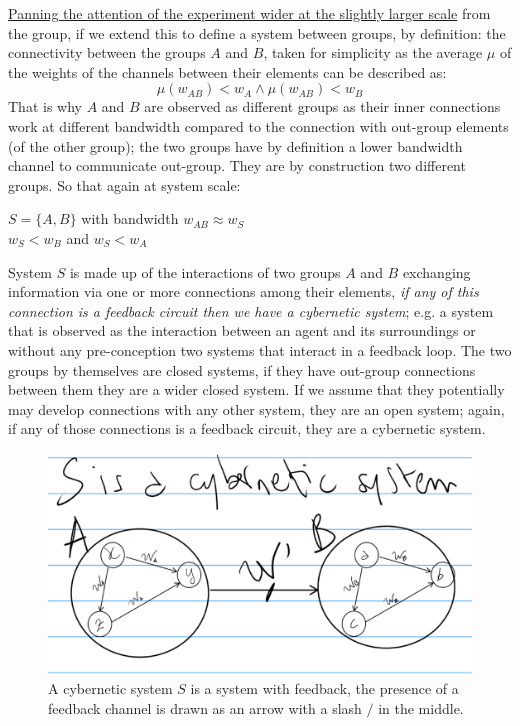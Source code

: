 \documentclass[14pt]{extarticle}
\begin{document}
\hspace*{15mm}\underline{Panning the attention of the experiment wider at the slightly larger scale} from the group, if we extend this to define a system between groups, by definition: the connectivity between the groups \(A\) and \(B\), taken for simplicity as the average $\mu$ of the weights of the channels between their elements can be described as:
\[\mu(w_{AB}) < w_A \wedge \mu(w_{AB}) < w_B\]
That is why \(A\) and \(B\) are observed as different groups as their inner connections work at different bandwidth compared to the connection with out-group elements (of the other group); the two groups have by definition a lower bandwidth channel to communicate out-group. They are by construction two different groups. So that again at system scale:
\begin{center}
\(S = \{ A, B \}\) with bandwidth \(w_{AB} \approx w_S\)\\
\(w_S < w_B\)  and  \(w_S < w_A\)
\end{center}

\hspace*{15mm}System \(S\) is made up of the interactions of two groups \(A\) and \(B\) exchanging information via one or more connections among their elements, \textit{if any of this connection is a feedback circuit then we have a cybernetic system}; e.g. a system that is observed as the interaction between an agent and its surroundings or without any pre-conception two systems that interact in a feedback loop.
\newline 
\hspace*{15mm}The two groups by themselves are closed systems, if they have out-group connections between them they are a wider closed system. If we assume that they potentially may develop connections with any other system, they are an open system; again, if any of those connections is a feedback circuit, they are a cybernetic system.

\vspace{0.5cm}

\begin{figure}[htbp]
\begin{minipage}[t]{0.90\linewidth}
    \includegraphics[width=\linewidth]{Fig__4_cybernetic_systems.eps}
	\caption{A cybernetic system \(S\) is a system with feedback, the presence of a feedback channel is drawn as an arrow with a slash \(/\) in the middle.}%
	\label{fig:fig4}
\end{minipage}%
\end{figure}
\end{document}
